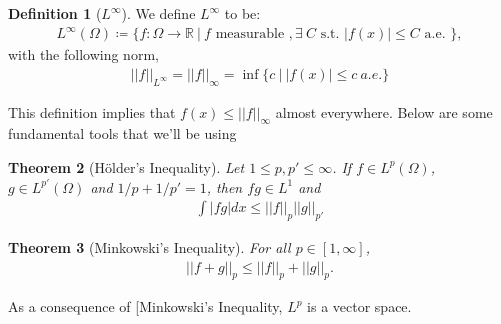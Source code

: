 \documentclass[psamsfonts]{amsart}
\newcommand{\given}{\ |\ }
\newtheorem{thm}{Theorem}[section]
\theoremstyle{definition}
\newtheorem{defn}[thm]{Definition}
\theoremstyle{remark}
\newcommand{\R}[0]{\mathbb{R}}
\numberwithin{equation}{section}
\begin{document}
\begin{defn}[\( L^\infty \)]
		We define \(L^\infty\) to be: 
		\begin{align}
			L^\infty(\Omega) \coloneqq \{ f: \Omega \to \R \given f \text{ measurable }, \exists\ C \text{ s.t. } |f(x)| \leq C \text{ a.e. } \}, 	
		\end{align}
		with the following norm, 
		\begin{align}
			||f||_{L^\infty} = || f||_\infty = \inf \{ c\ |\ |f(x)| \leq c\ a.e. \} 	
		\end{align}
\end{defn}
This definition implies that \( f(x) \leq || f||_\infty \) almost everywhere. Below are some fundamental tools that we'll be using
\begin{thm}[Hölder's Inequality]
		Let \( 1 \leq p, p' \leq \infty \). If \( f \in L^p(\Omega) \), \( g \in L^{p'}(\Omega) \) and \( 1/p + 1/p' = 1 \), then \( fg \in L^1 \) and
		\begin{align}
			\boxed{\int|fg|dx \leq ||f||_p ||g||_{p'}}	
		\end{align}
\end{thm}

\begin{thm}[Minkowski's Inequality]
	For all \( p \in [1, \infty] \), 
	\begin{align}
		\boxed{||f+g||_p \leq ||f||_p + ||g||_p.} 	
	\end{align}
\end{thm}
As a consequence of [Minkowski's Inequality, \(L^p \) is a vector space.
\end{document}
